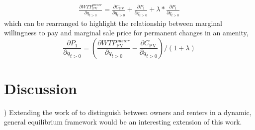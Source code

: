 \documentclass[ecta,nameyear,draft]{econsocart}
\theoremstyle{plain}
\theoremstyle{remark}
\begin{document}
\begin{eqnarray}
	\frac{\partial \mathit{WTP}^{\mathit{owner}}_{\mathrm{PV}}}{\partial q_{t>0}} =	\frac{\partial C_{\mathrm{PV}}}{\partial q_{t>0}}+\frac{\partial P_1} {\partial q_{t>0}}+ \lambda*\frac{\partial P_1}{\partial q_{t>0}}
\end{eqnarray}
which can be rearranged to highlight the relationship between marginal willingness to pay and marginal sale price for permanent changes in an amenity,
\begin{equation}
	\frac{\partial P_1} {\partial q_{t>0}}=\left(
	\frac{\partial \mathit{WTP}^{\mathit{owner}}_{\mathrm{PV}}}{\partial q_{t>0}}-\frac{\partial C_{\mathrm{PV}}}{\partial q_{t>0}}\right)/(1+\lambda)
\end{equation}

\section{Discussion})
Extending the work of \cite{kanemoto} to distinguish between owners and renters in a dynamic, general equilibrium framework would be an interesting extension of this work.
\end{document}
